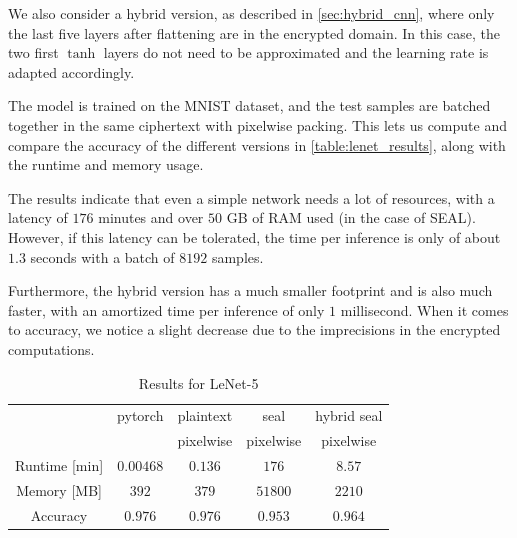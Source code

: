 \documentclass[a4paper,11pt,oneside]{report}
\begin{document}
We also consider a hybrid version, as described in \autoref{sec:hybrid_cnn}, where only the last five layers after flattening are in the encrypted domain. In this case, the two first $\tanh$ layers do not need to be approximated and the learning rate is adapted accordingly.

The model is trained on the MNIST dataset, and the test samples are batched together in the same ciphertext with pixelwise packing. This lets us compute and compare the accuracy of the different versions in \autoref{table:lenet_results}, along with the runtime and memory usage.

The results indicate that even a simple network needs a lot of resources, with a latency of $176$ minutes and over $50$ GB of RAM used (in the case of SEAL).
However, if this latency can be tolerated, the time per inference is only of about $1.3$ seconds with a batch of $8192$ samples.

Furthermore, the hybrid version has a much smaller footprint and is also much faster, with an amortized time per inference of only $1$ millisecond. When it comes to accuracy, we notice a slight decrease due to the imprecisions in the encrypted computations.

\begin{table}[h!]
  \begin{center}
    \caption{Results for LeNet-5}
    \label{table:lenet_results}
    \begin{tabular}{ c c c c c }
    \hline
    & pytorch & plaintext & seal & hybrid seal \\
    & & pixelwise & pixelwise & pixelwise \\
    \hline
    Runtime [min] & $0.00468$ & $0.136$ & $176$ & $8.57$ \\
    Memory [MB] & $392$ & $379$ & $51800$ & $2210$ \\
    Accuracy & $0.976$ & $0.976$ & $0.953$ & $0.964$ \\
    \hline
    \end{tabular}
  \end{center}
\end{table}


\end{document}
